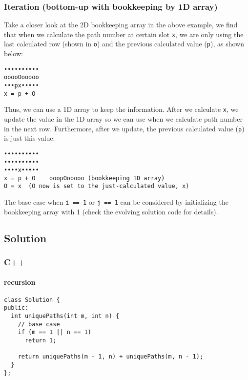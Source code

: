 \documentclass[12pt]{article}
\begin{document}
\subsubsection{Iteration (bottom-up with bookkeeping by 1D array)}
\label{sec:org0cd4616}
Take a closer look at the 2D bookkeeping array in the above example, we find that when we calculate the path number at certain slot \texttt{x}, we are only using the last calculated row (shown in \texttt{o}) and the previous calculated value (\texttt{p}), as shown below:
\begin{verbatim}
••••••••••
ooooOooooo
•••px•••••
x = p + O
\end{verbatim}
Thus, we can use a 1D array to keep the information. After we calculate \texttt{x}, we update the value in the 1D array so we can use when we calculate path number in the next row. Furthermore, after we update, the previous calculated value (\texttt{p}) is just this value:
\begin{verbatim}
••••••••••
••••••••••   
••••x•••••
x = p + O    ooopOooooo (bookkeeping 1D array)
O = x  (O now is set to the just-calculated value, x)
\end{verbatim}

The base case when \texttt{i == 1} or \texttt{j == 1} can be considered by initializing the bookkeeping array with 1 (check the evolving solution code for details).

\subsection{Solution}
\label{sec:orgc856c3a}
\subsubsection{C++}
\label{sec:org13c94e9}
\paragraph{recursion}
\label{sec:orga9d3d74}
\begin{verbatim}
class Solution {
public:
  int uniquePaths(int m, int n) {
    // base case 
    if (m == 1 || n == 1)
      return 1;

    return uniquePaths(m - 1, n) + uniquePaths(m, n - 1);
  }
};
\end{verbatim}
\end{document}
